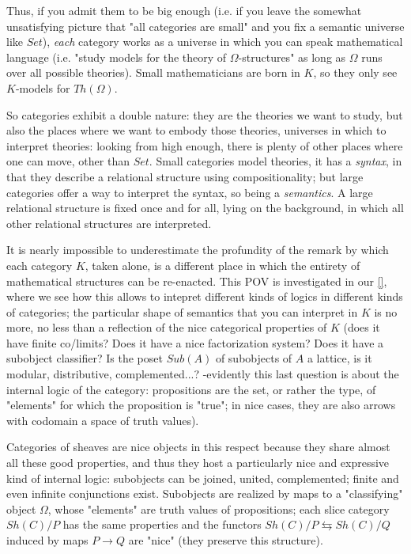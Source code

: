 \documentclass[a4paper, 11pt]{article}
\begin{document}
Thus, if you admit them to be big enough (i.e. if you leave the somewhat unsatisfying picture that "all categories are small" and you fix a semantic universe like $Set$), \emph{each} category works as a universe in which you can speak mathematical language (i.e. "study models for the theory of $\Omega$-structures" as long as $\Omega$ runs over all possible theories). Small mathematicians are born in $K$, so they only see $K$-models for $Th(\Omega)$. 

So categories exhibit a double nature: they are the theories we want to study, but also the places where we want to embody those theories, universes in which to interpret theories: looking from high enough, there is plenty of other places where one can move, other than $Set$. Small categories model theories, it has a \emph{syntax}, in that they describe a relational structure using compositionality; but large categories offer a way to interpret the syntax, so being a \emph{semantics}. A large relational structure is fixed once and for all, lying on the background, in which all other relational structures are interpreted.

It is nearly impossible to underestimate the profundity of the remark by which each category $K$, taken alone, is a different place in which the entirety of mathematical structures can be re-enacted. This POV is investigated in our \ref{}, where we see how this allows to intepret different kinds of logics in different kinds of categories; the particular shape of semantics that you can interpret in $K$ is no more, no less than a reflection of the nice categorical properties of $K$ (does it have finite co/limits? Does it have a nice factorization system? Does it have a subobject classifier? Is the poset $Sub(A)$ of subobjects of $A$ a lattice, is it modular, distributive, complemented...? -evidently this last question is about the internal logic of the category: propositions are the set, or rather the type, of "elements" for which the proposition is "true"; in nice cases, they are also arrows with codomain a space of truth values).

Categories of sheaves are nice objects in this respect because they share almost all these good properties, and thus they host a particularly nice and expressive kind of internal logic: subobjects can be joined, united, complemented; finite and even infinite conjunctions exist. Subobjects are realized by maps to a "classifying" object $\Omega$, whose "elements" are truth values of propositions; each slice category $Sh(C)/P$ has the same properties and the functors $Sh(C)/P \leftrightarrows Sh(C)/Q$ induced by maps $P\to Q$ are "nice" (they preserve this structure).
\end{document}
